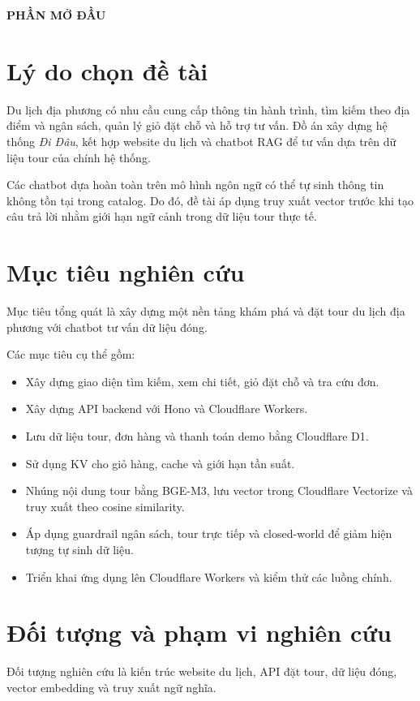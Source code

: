 \begin{center}
\large\textbf{PHẦN MỞ ĐẦU}
\end{center}

\section*{Lý do chọn đề tài}
Du lịch địa phương có nhu cầu cung cấp thông tin hành trình, tìm kiếm theo địa điểm và ngân sách, quản lý giỏ đặt chỗ và hỗ trợ tư vấn. Đồ án xây dựng hệ thống \emph{Đi Đâu}, kết hợp website du lịch và chatbot RAG để tư vấn dựa trên dữ liệu tour của chính hệ thống.

Các chatbot dựa hoàn toàn trên mô hình ngôn ngữ có thể tự sinh thông tin không tồn tại trong catalog. Do đó, đề tài áp dụng truy xuất vector trước khi tạo câu trả lời nhằm giới hạn ngữ cảnh trong dữ liệu tour thực tế.

\section*{Mục tiêu nghiên cứu}
Mục tiêu tổng quát là xây dựng một nền tảng khám phá và đặt tour du lịch địa phương với chatbot tư vấn dữ liệu đóng.

Các mục tiêu cụ thể gồm:
\begin{itemize}
    \item Xây dựng giao diện tìm kiếm, xem chi tiết, giỏ đặt chỗ và tra cứu đơn.
    \item Xây dựng API backend với Hono và Cloudflare Workers.
    \item Lưu dữ liệu tour, đơn hàng và thanh toán demo bằng Cloudflare D1.
    \item Sử dụng KV cho giỏ hàng, cache và giới hạn tần suất.
    \item Nhúng nội dung tour bằng BGE-M3, lưu vector trong Cloudflare Vectorize và truy xuất theo cosine similarity.
    \item Áp dụng guardrail ngân sách, tour trực tiếp và closed-world để giảm hiện tượng tự sinh dữ liệu.
    \item Triển khai ứng dụng lên Cloudflare Workers và kiểm thử các luồng chính.
\end{itemize}

\section*{Đối tượng và phạm vi nghiên cứu}
Đối tượng nghiên cứu là kiến trúc website du lịch, API đặt tour, dữ liệu đóng, vector embedding và truy xuất ngữ nghĩa.

